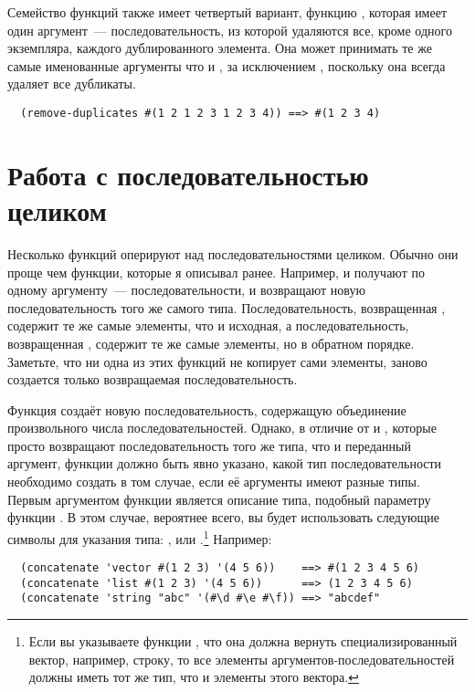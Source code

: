 Семейство функций  также имеет четвертый вариант, функцию
, которая имеет один аргумент~--- последовательность, из которой
удаляются все, кроме одного экземпляра, каждого дублированного элемента.  Она может
принимать те же самые именованные аргументы что и , за исключением
, поскольку она всегда удаляет все дубликаты.

\begin{verbatim}
  (remove-duplicates #(1 2 1 2 3 1 2 3 4)) ==> #(1 2 3 4)
\end{verbatim}

\section{Работа с последовательностью целиком}

Несколько функций оперируют над последовательностями целиком.  Обычно
они проще чем функции, которые я описывал ранее.  Например,
 и  получают по одному аргументу~--- последовательности, и
возвращают новую последовательность того же самого типа.  Последовательность, возвращенная
, содержит те же самые элементы, что и исходная,
а последовательность, возвращенная , содержит те же
самые элементы, но в обратном порядке.  Заметьте, что ни одна из этих функций не копирует
сами элементы, заново создается только возвращаемая последовательность.

Функция  создаёт новую последовательность, содержащую объединение произвольного
числа последовательностей.  Однако, в отличие от  и , которые
просто возвращают последовательность того же типа, что и переданный аргумент, функции
 должно быть явно указано, какой тип последовательности необходимо
создать в том случае, если её аргументы имеют разные типы.  Первым аргументом функции
является описание типа, подобный параметру  функции .
В этом случае, вероятнее всего, вы будет использовать следующие символы для указания типа:
,  или .\footnote{Если вы указываете функции
  , что она должна вернуть специализированный вектор, например, строку,
  то все элементы аргументов-последовательностей должны иметь тот же тип, что и элементы
  этого вектора.}  Например:

\begin{verbatim}
  (concatenate 'vector #(1 2 3) '(4 5 6))    ==> #(1 2 3 4 5 6)
  (concatenate 'list #(1 2 3) '(4 5 6))      ==> (1 2 3 4 5 6)
  (concatenate 'string "abc" '(#\d #\e #\f)) ==> "abcdef"
\end{verbatim}

